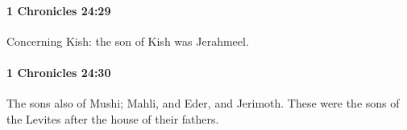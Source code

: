 		\paragraph{1 Chronicles 24:29} %
			\label{1CHRONICLES-24-29}

			Concerning Kish: the son of Kish was Jerahmeel.


		\paragraph{1 Chronicles 24:30} %
			\label{1CHRONICLES-24-30}

			The sons also of Mushi; Mahli, and Eder, and Jerimoth. These were the sons of the Levites after the house of their fathers.


